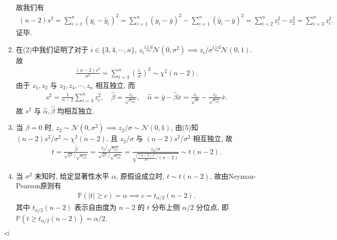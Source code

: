 \documentclass[11pt]{article}
\newenvironment{answer}[1][Solution]{\begin{trivlist}
    \item[\hskip \labelsep {\bfseries #1.}\hskip \labelsep]}{\hfill$\lhd$\end{trivlist}}
\newcommand\1{\mathds{1}}
\newcommand\NN{\mathcal{N}}
\newcommand\PP{\mathbb{P}}
\newcommand{\iid}{\overset{\text{i.i.d}}{\sim}}
\begin{document}
\begin{answer}
\begin{enumerate}[label = (\arabic*)]
\begin{align*}
        \end{align*}
        故我们有
        \begin{align*}
            (n-2)s^2 = \sum_{i=1}^{n} (y_i - \hat{y}_i)^2 = \sum_{i=1}^{n}(y_i - \bar{y})^2 - \sum_{i=1}^{n} (\hat{y}_i - \bar{y})^2 = \sum_{i=2}^{n} z_i^2 - z_2^2 = \sum_{i=3}^{n} z_i^2.
        \end{align*}
        证毕.
        \item 在(2)中我们证明了对于 $i\in \{3, 4, \cdots, n\}$, $z_i \iid \NN(0, \sigma^2) \implies z_i/\sigma \iid \NN(0, 1)$. 故
        \begin{align*}
            \frac{(n-2)s^2}{\sigma^2} = \sum_{i=3}^{n} \left(\frac{z_i}{\sigma}\right)^2 \sim \chi^2(n-2).
        \end{align*}
        由于 $z_1, z_2$ 与 $z_3, z_4, \cdots, z_n$ 相互独立, 而
        \begin{align*}
            s^2 = \frac{1}{n-2}\sum_{i=3}^{n} z_i^2, \quad \hat{\beta} = \frac{z_2}{\sqrt{s_{xx}}}, \quad \hat{\alpha} = \bar{y} - \hat{\beta}\bar{x} = \frac{z_1}{\sqrt{n}} - \frac{z_2}{\sqrt{s_{xx}}}\bar{x}.
        \end{align*}
        故 $s^2$ 与 $\hat{\alpha}, \hat{\beta}$ 均相互独立. 
        \item 当 $\beta = 0$ 时, $z_2 \sim \NN(0, \sigma^2)\implies z_2/\sigma \sim \NN(0, 1)$, 由(5)知 $(n-2)s^2/\sigma^2 \sim \chi^2(n-2)$. 且 $z_2/\sigma$ 与 $(n-2)s^2/\sigma^2$ 相互独立, 故
        \begin{align*}
            t = \frac{\hat{\beta}}{\sqrt{s^2}/\sqrt{s_{xx}}} = \frac{z_2/\sqrt{s_{xx}}}{\sqrt{s^2}/ \sqrt{s_{xx}}}= \frac{z_2/\sigma}{\sqrt{\frac{(n-2)s^2}{\sigma^2}/(n-2)}} \sim t(n-2).
        \end{align*}
        \item 当 $\sigma^2$ 未知时, 给定显著性水平 $\alpha$, 原假设成立时, $t \sim t(n-2)$, 故由Neyman-Pearson原则有
        \begin{align*}
            \PP(|t| \ge c) = \alpha \implies c = t_{\alpha/2}(n-2).
        \end{align*}
        其中 $t_{\alpha/2}(n-2)$ 表示自由度为 $n-2$ 的 $t$ 分布上侧 $\alpha/2$ 分位点, 即 $\PP(t \ge t_{\alpha/2}(n-2)) = \alpha/2$.
    \end{enumerate}
\end{answer}
\end{document}
